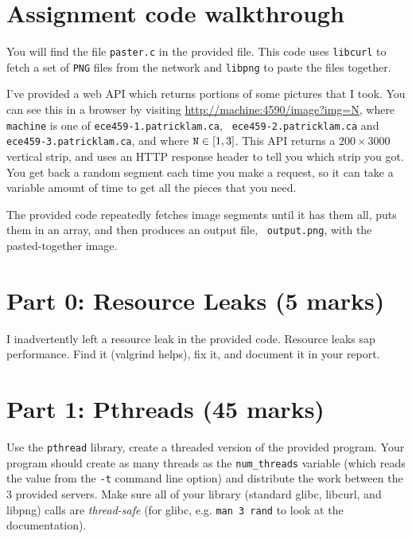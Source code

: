 \documentclass[letterpaper,10pt]{article}
\begin{document}

\section*{Assignment code walkthrough}

You will find the file {\tt paster.c} in the provided file. This code uses
{\tt libcurl} to fetch a set of {\tt PNG} files from the network and {\tt libpng}
to paste the files together.

I've provided a web API which returns portions of some pictures that I took.
You can see this in a browser by visiting 
\url{http://machine:4590/image?img=N},
where {\tt machine} is one of {\tt ece459-1.patricklam.ca}, {\tt
  ece459-2.patricklam.ca} and {\tt ece459-3.patricklam.ca}, and where $\mbox{\tt N} \in [1,3]$. This API returns a $200 \times 3000$ vertical strip, and uses
an HTTP response header to tell you which strip you got. You get back a random
segment each time you make a request, so it can take a variable amount of time to get all the pieces that you need.

The provided code repeatedly fetches image segments until it has them
all, puts them in an array, and then produces an output file, {\tt
  output.png}, with the pasted-together image.

\newpage

\section*{Part 0: Resource Leaks (5 marks)}

I inadvertently left a resource leak in the provided code. Resource
leaks sap performance. Find it (valgrind helps), fix it, and document
it in your report.

\section*{Part 1: Pthreads (45 marks)}

Use the {\tt pthread} library, create a threaded version of the
provided program.  Your program should create as many threads as the
{\tt num\_threads} variable (which reads the value from the {\tt -t}
command line option) and distribute the work between the 3 provided
servers. Make sure all of your library (standard glibc, libcurl, and
libpng) calls are {\it thread-safe} (for glibc, e.g. {\tt man 3 rand} to
look at the documentation).  
\end{document}
